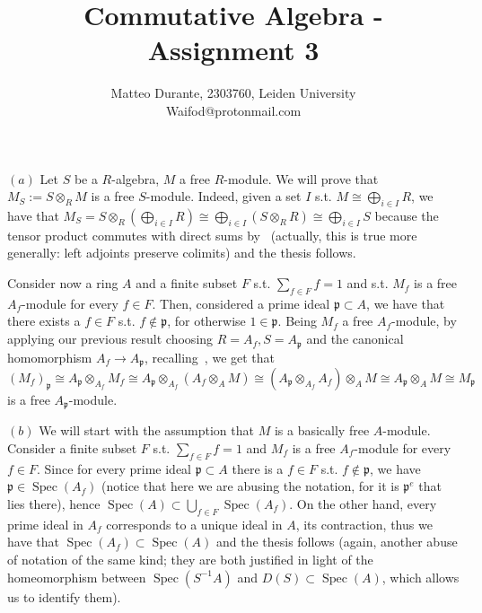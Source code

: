 \documentclass{article}
\newcommand{\pid}{\mathfrak{p}}
\newcommand{\exercise}[1]{\noindent {\bf Exercise #1}}
\DeclareMathOperator{\Spec}{Spec}
\begin{document}
\title{Commutative Algebra - Assignment 3}

\author{Matteo Durante, 2303760, Leiden University\\Waifod@protonmail.com}

\maketitle


\exercise{1}

$(a)$ Let $S$ be a $R$-algebra, $M$ a free $R$-module. We will prove that $M_S:=S\otimes_R M$ is a free $S$-module. Indeed, given a set $I$ s.t. $M\cong\bigoplus_{i\in I} R$, we have that $M_S=S\otimes_R (\bigoplus_{i\in I} R)\cong\bigoplus_{i\in I} (S\otimes_R R)\cong\bigoplus_{i\in I} S$ because the tensor product commutes with direct sums by~\cite[ex. 2.20]{atm} (actually, this is true more generally: left adjoints preserve colimits) and the thesis follows.

Consider now a ring $A$ and a finite subset $F$ s.t. $\sum_{f\in F} f=1$ and s.t. $M_f$ is a free $A_f$-module for every $f\in F$. Then, considered a prime ideal $\pid\subset A$, we have that there exists a $f\in F$ s.t. $f\not\in\pid$, for otherwise $1\in\pid$. Being $M_f$ a free $A_f$-module, by applying our previous result choosing $R=A_f,S=A_{\pid}$ and the canonical homomorphism $A_f\rightarrow A_{\pid}$, recalling~\cite[prop. 3.5]{atm}, we get that $(M_f)_{\pid}\cong A_{\pid}\otimes_{A_f} M_f\cong A_{\pid}\otimes_{A_f}(A_f\otimes_A M)\cong (A_{\pid}\otimes_{A_f} A_f)\otimes_A M\cong A_{\pid}\otimes_A M\cong M_{\pid}$ is a free $A_{\pid}$-module.

$(b)$ We will start with the assumption that $M$ is a basically free $A$-module. Consider a finite subset $F$ s.t. $\sum_{f\in F} f=1$ and $M_f$ is a free $A_f$-module for every $f\in F$. Since for every prime ideal $\pid\subset A$ there is a $f\in F$ s.t. $f\not\in\pid$, we have $\pid\in\Spec(A_f)$ (notice that here we are abusing the notation, for it is $\pid^e$ that lies there), hence $\Spec(A)\subset\bigcup_{f\in F}\Spec(A_f)$. On the other hand, every prime ideal in $A_f$ corresponds to a unique ideal in $A$, its contraction, thus we have that $\Spec(A_f)\subset\Spec(A)$ and the thesis follows (again, another abuse of notation of the same kind; they are both justified in light of the homeomorphism between $\Spec(S^{-1}A)$ and $D(S)\subset\Spec(A)$, which allows us to identify them).
\end{document}
